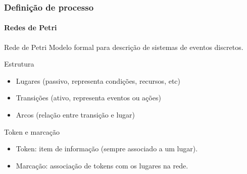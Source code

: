 \begin{frame}
	\frametitle{Definição de processo}
	\framesubtitle{Redes de Petri}
	
	\begin{block:concept}{Rede de Petri}
		Modelo formal para descrição de sistemas de eventos discretos.
	\end{block:concept}
	
	\begin{block:concept}{Estrutura}
		\begin{itemize}
			\item Lugares (passivo, representa condições, recursos, etc)
			\item Transições (ativo, representa eventos ou ações)
			\item Arcos (relação entre transição e lugar)
		\end{itemize}
	\end{block:concept}

	\begin{block:concept}{Token e marcação}
	\begin{itemize}
		\item Token: item de informação (sempre associado a um lugar).
		\item Marcação: associação de tokens com os lugares na rede.
	\end{itemize}
	\end{block:concept}
\end{frame}

